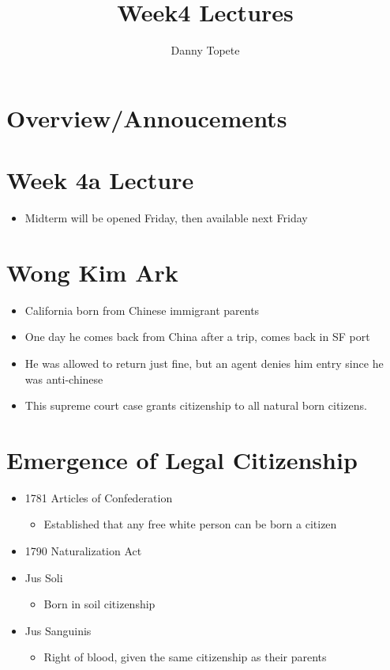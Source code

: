 \documentclass{article}
\title{Week4 Lectures}
\author{Danny Topete}
\begin{document}
\maketitle

\section*{Overview/Annoucements}

\section*{Week 4a Lecture}
\begin{itemize}
  \item Midterm will be opened Friday, then available next Friday
\end{itemize}

\section{Wong Kim Ark}

\begin{itemize}
  \item California born from Chinese immigrant parents
  \item One day he comes back from China after a trip,
    comes back in SF port
  \item He was allowed to return just fine, but an agent 
    denies him entry since he was anti-chinese
  \item This supreme court case grants citizenship to all
    natural born citizens.
\end{itemize}

\section{Emergence of Legal Citizenship}
\begin{itemize}
  \item 1781 Articles of Confederation
    \begin{itemize}
      \item Established that any free white person can be born a citizen
    \end{itemize}
  \item 1790 Naturalization Act
  \item Jus Soli
    \begin{itemize}
      \item Born in soil citizenship
    \end{itemize}
  \item Jus Sanguinis
    \begin{itemize}
      \item Right of blood, given the same citizenship as their parents
    \end{itemize}
\end{itemize}
\end{document}
